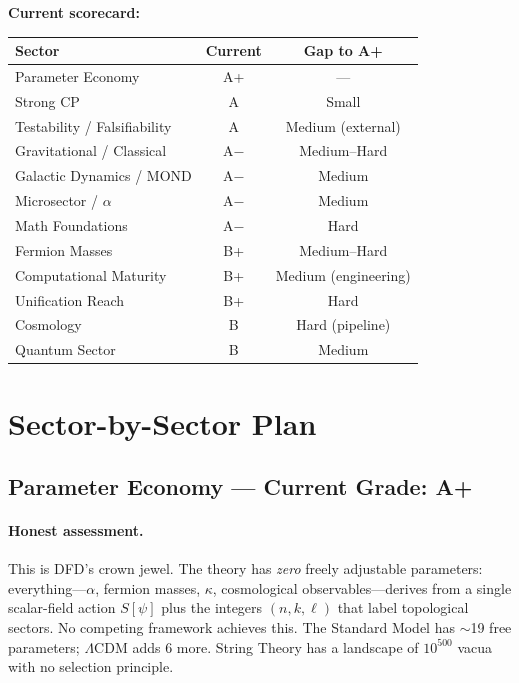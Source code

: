 \documentclass[11pt,a4paper]{article}
\begin{document}
\bigskip
\noindent\textbf{Current scorecard:}

\begin{center}
\begin{tabular}{lcc}
\toprule
\textbf{Sector} & \textbf{Current} & \textbf{Gap to A+} \\
\midrule
Parameter Economy & \textcolor{gradeAplus}{A+} & --- \\
Strong CP & \textcolor{gradeA}{A} & Small \\
Testability / Falsifiability & \textcolor{gradeA}{A} & Medium (external) \\
Gravitational / Classical & \textcolor{gradeAminus}{A$-$} & Medium--Hard \\
Galactic Dynamics / MOND & \textcolor{gradeAminus}{A$-$} & Medium \\
Microsector / $\alpha$ & \textcolor{gradeAminus}{A$-$} & Medium \\
Math Foundations & \textcolor{gradeAminus}{A$-$} & Hard \\
Fermion Masses & \textcolor{gradeBplus}{B+} & Medium--Hard \\
Computational Maturity & \textcolor{gradeBplus}{B+} & Medium (engineering) \\
Unification Reach & \textcolor{gradeBplus}{B+} & Hard \\
Cosmology & \textcolor{gradeB}{B} & Hard (pipeline) \\
Quantum Sector & \textcolor{gradeB}{B} & Medium \\
\bottomrule
\end{tabular}
\end{center}


\newpage
\section{Sector-by-Sector Plan}

\subsection{Parameter Economy --- Current Grade: A+}

\paragraph{Honest assessment.}
This is DFD's crown jewel. The theory has \emph{zero} freely adjustable parameters: everything---$\alpha$, fermion masses, $\kappa$, cosmological observables---derives from a single scalar-field action $S[\psi]$ plus the integers $(n, k, \ell)$ that label topological sectors. No competing framework achieves this. The Standard Model has $\sim$19 free parameters; $\Lambda$CDM adds 6 more. String Theory has a landscape of $10^{500}$ vacua with no selection principle.
\end{document}
